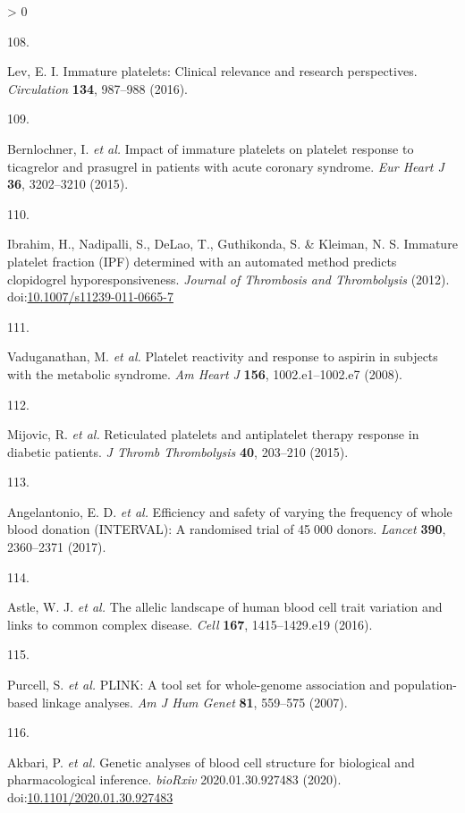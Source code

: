 \documentclass[11pt,twoside]{bristolthesis}
\newlength{\cslhangindent}
\newlength{\csllabelwidth}
\newenvironment{CSLReferences}[2] %
 {%
  \setlength{\parindent}{0pt}
  \ifodd #1 \everypar{\setlength{\hangindent}{\cslhangindent}}\ignorespaces\fi
  \ifnum #2 > 0
  \setlength{\parskip}{#2\baselineskip}
  \fi
 }%
 {}
\newcommand{\CSLLeftMargin}[1]{\parbox[t]{\csllabelwidth}{#1}}
\newcommand{\CSLRightInline}[1]{\parbox[t]{\linewidth - \csllabelwidth}{#1}\break}
\begin{document}
\begin{CSLReferences}{0}{0}
\leavevmode\hypertarget{ref-Lev2016a}{}%
\CSLLeftMargin{108. }
\CSLRightInline{Lev, E. I. Immature platelets: Clinical relevance and research perspectives. \emph{Circulation} \textbf{134}, 987--988 (2016).}

\leavevmode\hypertarget{ref-Bernlochner2015a}{}%
\CSLLeftMargin{109. }
\CSLRightInline{Bernlochner, I. \emph{et al.} Impact of immature platelets on platelet response to ticagrelor and prasugrel in patients with acute coronary syndrome. \emph{Eur Heart J} \textbf{36}, 3202--3210 (2015).}

\leavevmode\hypertarget{ref-Ibrahim2012}{}%
\CSLLeftMargin{110. }
\CSLRightInline{Ibrahim, H., Nadipalli, S., DeLao, T., Guthikonda, S. \& Kleiman, N. S. Immature platelet fraction (IPF) determined with an automated method predicts clopidogrel hyporesponsiveness. \emph{Journal of Thrombosis and Thrombolysis} (2012). doi:\href{https://doi.org/10.1007/s11239-011-0665-7}{10.1007/s11239-011-0665-7}}

\leavevmode\hypertarget{ref-Vaduganathan2008a}{}%
\CSLLeftMargin{111. }
\CSLRightInline{Vaduganathan, M. \emph{et al.} Platelet reactivity and response to aspirin in subjects with the metabolic syndrome. \emph{Am Heart J} \textbf{156}, 1002.e1--1002.e7 (2008).}

\leavevmode\hypertarget{ref-Mijovic2015a}{}%
\CSLLeftMargin{112. }
\CSLRightInline{Mijovic, R. \emph{et al.} Reticulated platelets and antiplatelet therapy response in diabetic patients. \emph{J Thromb Thrombolysis} \textbf{40}, 203--210 (2015).}

\leavevmode\hypertarget{ref-DiAngelantonio2017}{}%
\CSLLeftMargin{113. }
\CSLRightInline{Angelantonio, E. D. \emph{et al.} Efficiency and safety of varying the frequency of whole blood donation (INTERVAL): A randomised trial of 45 000 donors. \emph{Lancet} \textbf{390}, 2360--2371 (2017).}

\leavevmode\hypertarget{ref-Astle2016}{}%
\CSLLeftMargin{114. }
\CSLRightInline{Astle, W. J. \emph{et al.} The allelic landscape of human blood cell trait variation and links to common complex disease. \emph{Cell} \textbf{167}, 1415--1429.e19 (2016).}

\leavevmode\hypertarget{ref-Purcell2007a}{}%
\CSLLeftMargin{115. }
\CSLRightInline{Purcell, S. \emph{et al.} PLINK: A tool set for whole-genome association and population-based linkage analyses. \emph{Am J Hum Genet} \textbf{81}, 559--575 (2007).}

\leavevmode\hypertarget{ref-Akbari2020}{}%
\CSLLeftMargin{116. }
\CSLRightInline{Akbari, P. \emph{et al.} Genetic analyses of blood cell structure for biological and pharmacological inference. \emph{bioRxiv} 2020.01.30.927483 (2020). doi:\href{https://doi.org/10.1101/2020.01.30.927483}{10.1101/2020.01.30.927483}}


\end{CSLReferences}
\end{document}
